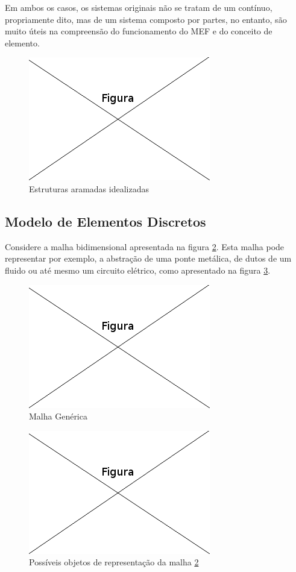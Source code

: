 \documentclass[
    12pt,               %
    openright,          %
    oneside,
    a4paper,            %
    english,            %
    french,             %
    spanish,            %
    brazil              %
    ]{abntex2}
\begin{document}
Em ambos os casos, os sistemas originais não se tratam de um contínuo, propriamente dito, mas de um sistema composto por partes, no entanto, são muito úteis na compreensão do funcionamento do MEF e do conceito de elemento.


\begin{figure}[!htb]
\centering
\includegraphics[scale=0.5]{figuras/temp.png}
\caption{Estruturas aramadas idealizadas}
\label{fig:arame}
\end{figure}

\subsection{Modelo de Elementos Discretos}

Considere a malha bidimensional  apresentada na figura \ref{fig:malhaGenerica}. Esta malha pode representar por exemplo, a abstração de uma ponte metálica, de dutos de um fluido ou até mesmo um circuito elétrico, como apresentado na figura \ref{fig:repMalhaGenerica}.
\begin{figure}[!htb]
\centering
\includegraphics[scale=0.5]{figuras/temp.png}
\caption{Malha Genérica}
\label{fig:malhaGenerica}
\end{figure}

\begin{figure}[!htb]
\centering
\includegraphics[scale=0.5]{figuras/temp.png}
\caption{Possíveis objetos de representação da malha \ref{fig:malhaGenerica}}
\label{fig:repMalhaGenerica}
\end{figure}
\end{document}
